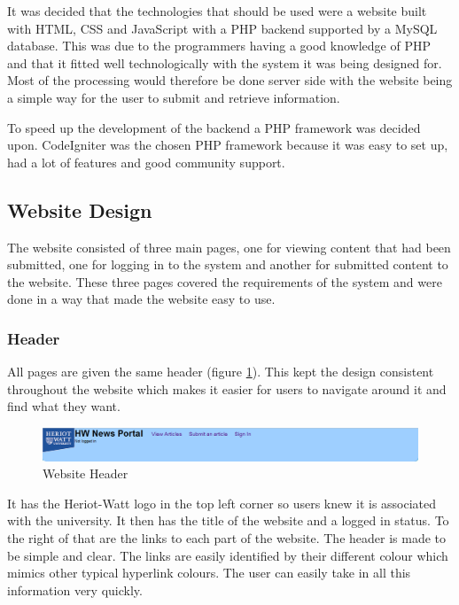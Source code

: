 It was decided that the technologies that should be used were a website built with HTML, CSS and JavaScript with a PHP backend supported by a MySQL database. This was due to the programmers having a good knowledge of PHP and that it fitted well technologically with the system it was being designed for. Most of the processing would therefore be done server side with the website being a simple way for the user to submit and retrieve information.

To speed up the development of the backend a PHP framework was decided upon. CodeIgniter was the chosen PHP framework because it was easy to set up, had a lot of features and good community support.

\subsection{Website Design}
The website consisted of three main pages, one for viewing content that had been submitted, one for logging in to the system and another for submitted content to the website. These three pages covered the requirements of the system and were done in a way that made the website easy to use. 

\subsubsection{Header}
All pages are given the same header (figure \ref{Website-Header}). This kept the design consistent throughout the website which makes it easier for users to navigate around it and find what they want.

\begin{figure}
\begin{centering}
\includegraphics[width=\textwidth]{Diagrams/Website-Header}
\par\end{centering}

\caption{Website Header}
\label{Website-Header}
\end{figure}

It has the Heriot-Watt logo in the top left corner so users knew it is associated with the university. It then has the title of the website and a logged in status. To the right of that are the links to each part of the website. The header is made to be simple and clear. The links are easily identified by their different colour which mimics other typical hyperlink colours. The user can easily take in all this information very quickly.

